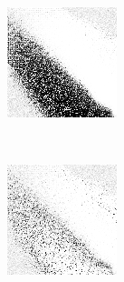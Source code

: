
\begin{figure}
\center

	\begin{subfigure}[t]{0.22\textwidth}
		\includegraphics[width=\textwidth]{images/findings/round2/strats/random/hand_max_min.png}
		\caption{\handmaxmin}
	\end{subfigure}
	~
	\begin{subfigure}[t]{0.22\textwidth}
		\includegraphics[width=\textwidth]{images/findings/round2/strats/random/hand_max_avg.png}

\end{subfigure}
\end{figure}
